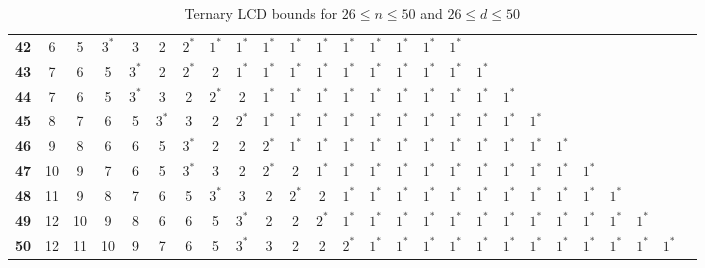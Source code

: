 \begin{sidewaystable}
\begin{tabular}{|c| c c c c c c c c c c c c c c c c c c c c c c c c c |}
\textbf{42} & 6 & 5 & $3^*$ & 3 & 2 & $2^*$ & $1^*$ & $1^*$ & $1^*$ & $1^*$ & $1^*$ & $1^*$ & $1^*$ & $1^*$ & $1^*$ & $1^*$ & & & & & & & & & \\
\textbf{43} & 7 & 6 & 5 & $3^*$ & 2 & $2^*$ & 2 & $1^*$ & $1^*$ & $1^*$ & $1^*$ & $1^*$ & $1^*$ & $1^*$ & $1^*$ & $1^*$ & $1^*$ & & & & & & & & \\
\textbf{44} & 7 & 6 & 5 & $3^*$ & 3 & 2 & $2^*$ & 2 & $1^*$ & $1^*$ & $1^*$ & $1^*$ & $1^*$ & $1^*$ & $1^*$ & $1^*$ & $1^*$ & $1^*$ & & & & & & & \\
\textbf{45} & 8 & 7 & 6 & 5 & $3^*$ & 3 & 2 & $2^*$ & $1^*$ & $1^*$ & $1^*$ & $1^*$ & $1^*$ & $1^*$ & $1^*$ & $1^*$ & $1^*$ & $1^*$ & $1^*$ & & & & & & \\
\textbf{46} & 9 & 8 & 6 & 6 & 5 & $3^*$ & 2 & 2 & $2^*$ & $1^*$ & $1^*$ & $1^*$ & $1^*$ & $1^*$ & $1^*$ & $1^*$ & $1^*$ & $1^*$ & $1^*$ & $1^*$ & & & & & \\
\textbf{47} & 10 & 9 & 7 & 6 & 5 & $3^*$ & 3 & 2 & $2^*$ & 2 & $1^*$ & $1^*$ & $1^*$ & $1^*$ & $1^*$ & $1^*$ & $1^*$ & $1^*$ & $1^*$ & $1^*$ & $1^*$ & & & & \\
\textbf{48} & 11 & 9 & 8 & 7 & 6 & 5 & $3^*$ & 3 & 2 & $2^*$ & 2 & $1^*$ & $1^*$ & $1^*$ & $1^*$ & $1^*$ & $1^*$ & $1^*$ & $1^*$ & $1^*$ & $1^*$ & $1^*$ & & & \\
\textbf{49} & 12 & 10 & 9 & 8 & 6 & 6 & 5 & $3^*$ & 2 & 2 & $2^*$ & $1^*$ & $1^*$ & $1^*$ & $1^*$ & $1^*$ & $1^*$ & $1^*$ & $1^*$ & $1^*$ & $1^*$ & $1^*$ & $1^*$ & & \\
\textbf{50} & 12 & 11 & 10 & 9 & 7 & 6 & 5 & $3^*$ & 3 & 2 & 2 & $2^*$ & $1^*$ & $1^*$ & $1^*$ & $1^*$ & $1^*$ & $1^*$ & $1^*$ & $1^*$ & $1^*$ & $1^*$ & $1^*$ & $1^*$ & \\
\hline
\end{tabular}
\caption{Ternary LCD bounds for $26 \leq n \leq 50$ and $26 \leq d \leq 50$}
\label{tab:lp_tables_q3_26_50_26_50}
\end{sidewaystable}